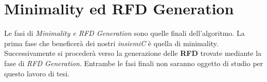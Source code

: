 \section{Minimality ed RFD Generation}
Le fasi di \emph{Minimality e RFD Generation} sono quelle finali dell'algoritmo. La prima fase che beneficerà dei nostri \emph{insiemiC} è quella di minimality. Successivamente si procederà verso la generazione delle \textbf{RFD} trovate mediante la fase di \emph{RFD Generation}. Entrambe le fasi finali non saranno oggetto di studio per questo lavoro di tesi.